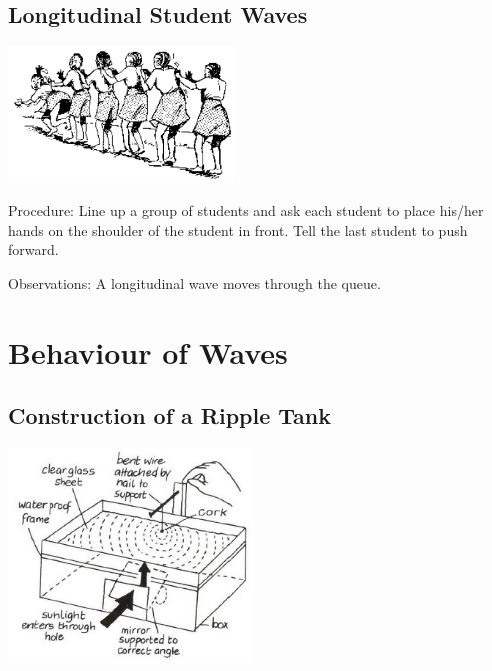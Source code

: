 \begin{multicols}{2}
\subsection{Longitudinal Student Waves}

\begin{center}
\includegraphics[width=0.45\textwidth]{./img/source/longitudinal-waves.png}
\end{center}

\begin{description*}
\item[Procedure:]{Line up a group of students and ask each student to place his/her hands on the shoulder of the student in front. Tell the last student to push forward.}
\item[Observations:]{A longitudinal wave moves through the queue.}
\end{description*}


\section*{Behaviour of Waves} 


\subsection{Construction of a Ripple Tank} 

\begin{center}
\includegraphics[width=0.49\textwidth]{./img/vso/ripple-tank.jpg}
\end{center}


\end{multicols}
